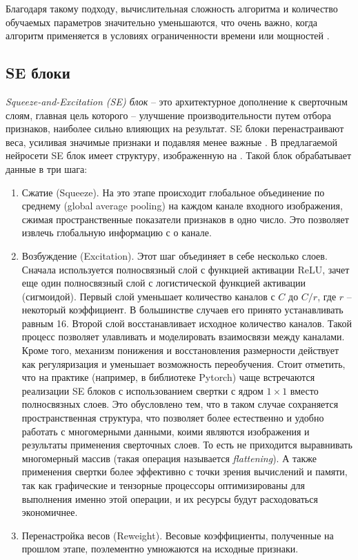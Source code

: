 Благодаря такому подходу, вычислительная сложность алгоритма и количество обучаемых параметров значительно уменьшаются, что очень важно, когда алгоритм применяется в условиях ограниченности времени или мощностей \cite[2-3]{mobilenet}.

\subsection{SE блоки}
\textit{Squeeze-and-Excitation (SE) блок} -- это архитектурное дополнение к сверточным слоям, главная цель которого -- улучшение производительности путем отбора признаков, наиболее сильно влияющих на результат. SE блоки перенастраивают веса, усиливая значимые признаки и подавляя менее важные \cite{squeeze}. В предлагаемой нейросети SE блок имеет структуру, изображенную на . Такой блок обрабатывает данные в три шага:
\begin{enumerate}[1.]
	\item Сжатие (Squeeze). На это этапе происходит глобальное объединение по среднему (global average pooling) на каждом канале входного изображения, сжимая пространственные показатели признаков в одно число. Это позволяет извлечь глобальную информацию с о канале.
	
	\item Возбуждение (Excitation). Этот шаг объединяет в себе несколько слоев. Сначала используется полносвязный слой с функцией активации ReLU, зачет еще один полносвязный слой с логистической функцией активации (сигмоидой). Первый слой уменьшает количество каналов с $C$ до $C/r$, где $r$ -- некоторый коэффициент. В большинстве случаев его принято устанавливать равным 16. Второй слой восстанавливает исходное количество каналов. Такой процесс позволяет улавливать и моделировать взаимосвязи между каналами. Кроме того, механизм понижения и восстановления размерности действует как регуляризация и уменьшает возможность переобучения. Стоит отметить, что на практике (например, в библиотеке Pytorch) чаще встречаются реализации SE блоков с использованием свертки с ядром $1 \times 1$ вместо полносвязных слоев. Это обусловлено тем, что в таком случае сохраняется пространственная структура, что позволяет более естественно и удобно работать с многомерными данными, коими являются изображения и результаты применения сверточных слоев. То есть не приходится выравнивать многомерный массив (такая операция называется \textit{flattening}). А также применения свертки более эффективно с точки зрения вычислений и памяти, так как графические и тензорные процессоры оптимизированы для выполнения именно этой операции, и их ресурсы будут расходоваться экономичнее.
	
	\item Перенастройка весов (Reweight). Весовые коэффициенты, полученные на прошлом этапе, поэлементно умножаются на исходные признаки.
\end{enumerate}


